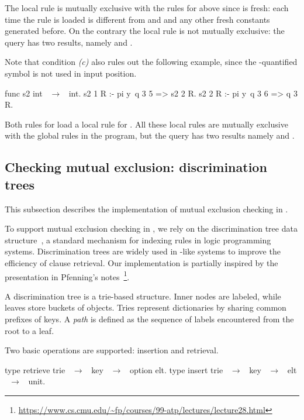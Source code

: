 The local rule
 is mutually exclusive with the rules for  above
since  is fresh: each time the rule is loaded
 is different from  and  and any other
fresh constants generated before. On the contrary the local rule 
is not mutually exclusive: the query  has two results, namely
 and  .

Note that condition \textit{(c)} also rules out the following example,
since the \pi-quantified symbol  is not used in input position.

\begin{elpicode}
func s2 int ~$\to$~ int.
s2 1 R :- pi y\ q 3 5 => s2 2 R. 
s2 2 R :- pi y\ q 3 6 => q 3 R. 
\end{elpicode}

Both rules for  load a local rule for . All these local
rules are mutually exclusive with the global rules in the program, but the query 
 has two results namely  and  . 

\newcommand{\pfdt}{https://www.cs.cmu.edu/~fp/courses/99-atp/lectures/lecture28.html}
\subsection{Checking mutual exclusion: discrimination trees}

This subsection describes the implementation of mutual exclusion checking in \elpi.

To support mutual exclusion checking in \elpi, we rely on the discrimination
tree data structure~\cite{disc-tree}, a standard mechanism for indexing rules in
logic programming systems. Discrimination trees are widely used in \prolog-like
systems to improve the efficiency of clause retrieval. Our implementation is
partially inspired by the presentation in Pfenning's
notes~\footnote{\url{\pfdt}}.

A discrimination tree is a trie-based structure. Inner nodes are labeled,
while leaves store buckets of objects. Tries represent dictionaries by sharing
common prefixes of keys. A \emph{path} is defined as the sequence of labels
encountered from the root to a leaf.

Two basic operations are supported: insertion and retrieval.
%
\begin{camlcode}
  type retrieve trie ~$\to$~ key ~$\to$~ option elt.
  type insert   trie ~$\to$~ key ~$\to$~ elt ~$\to$~ unit.
\end{camlcode}

